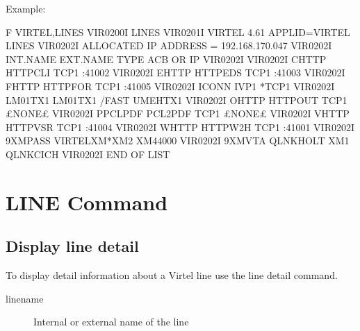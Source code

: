 \documentclass[letterpaper,10pt,english]{sphinxmanual}
\begin{document}
Example:

\begin{sphinxVerbatim}[commandchars=\\\{\}]
F VIRTEL,LINES
VIR0200I LINES
VIR0201I VIRTEL 4.61 APPLID=VIRTEL  LINES
VIR0202I ALLOCATED IP ADDRESS = 192.168.170.047
VIR0202I INT.NAME EXT.NAME TYPE  ACB OR IP
VIR0202I \PYGZhy{}\PYGZhy{}\PYGZhy{}\PYGZhy{}\PYGZhy{}\PYGZhy{}\PYGZhy{}\PYGZhy{} \PYGZhy{}\PYGZhy{}\PYGZhy{}\PYGZhy{}\PYGZhy{}\PYGZhy{}\PYGZhy{}\PYGZhy{} \PYGZhy{}\PYGZhy{}\PYGZhy{}\PYGZhy{}\PYGZhy{} \PYGZhy{}\PYGZhy{}\PYGZhy{}\PYGZhy{}\PYGZhy{}\PYGZhy{}\PYGZhy{}\PYGZhy{}\PYGZhy{}
VIR0202I C\PYGZhy{}HTTP   HTTP\PYGZhy{}CLI TCP1  :41002
VIR0202I E\PYGZhy{}HTTP   HTTP\PYGZhy{}EDS TCP1  :41003
VIR0202I F\PYGZhy{}HTTP   HTTP\PYGZhy{}FOR TCP1  :41005
VIR0202I I\PYGZhy{}CONN   IVP1    *TCP1
VIR0202I LM01TX1  LM01TX1  /FAST UMEHTX1
VIR0202I O\PYGZhy{}HTTP   HTTP\PYGZhy{}OUT TCP1  £NONE£
VIR0202I P\PYGZhy{}PCLPDF PCL2PDF  TCP1  £NONE£
VIR0202I V\PYGZhy{}HTTP   HTTP\PYGZhy{}VSR TCP1  :41004
VIR0202I W\PYGZhy{}HTTP   HTTP\PYGZhy{}W2H TCP1  :41001
VIR0202I 9\PYGZhy{}XMPASS VIRTELXM*XM2   XM44000
VIR0202I 9\PYGZhy{}XMVTA  QLNKHOLT XM1   QLNKCICH
VIR0202I \PYGZhy{}\PYGZhy{}\PYGZhy{}END OF LIST\PYGZhy{}\PYGZhy{}\PYGZhy{}
\end{sphinxVerbatim}

\ignorespaces 

\section{LINE Command}
\label{\detokenize{audit_operations_ and_performance:line-command}}\label{\detokenize{audit_operations_ and_performance:index-5}}

\subsection{Display line detail}
\label{\detokenize{audit_operations_ and_performance:display-line-detail}}
To display detail information about a Virtel line use the line detail command.

\begin{sphinxVerbatim}[commandchars=\\\{\}]
  
\end{sphinxVerbatim}
\begin{description}
\item[{linename}] \leavevmode
Internal or external name of the line

\end{description}
\end{document}
